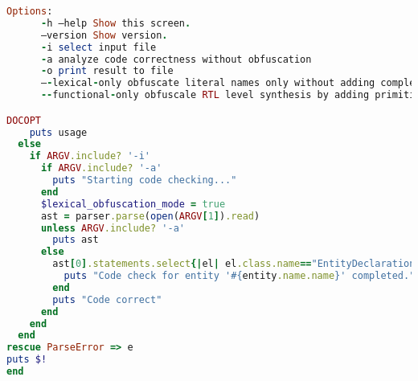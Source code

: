 \begin{lstlisting}[language=Ruby, style=rubystyle]
      Options:
      -h —help Show this screen.
      —version Show version.
      -i select input file
      -a analyze code correctness without obfuscation
      -o print result to file
      —-lexical-only obfuscate literal names only without adding complexity to RTL level
      --functional-only obfuscale RTL level synthesis by adding primitives without changing literal names

DOCOPT
    puts usage
  else
    if ARGV.include? '-i'
      if ARGV.include? '-a'
        puts "Starting code checking..."
      end
      $lexical_obfuscation_mode = true
      ast = parser.parse(open(ARGV[1]).read)
      unless ARGV.include? '-a'
        puts ast
      else
        ast[0].statements.select{|el| el.class.name=="EntityDeclaration"}.each do |entity|
          puts "Code check for entity '#{entity.name.name}' completed."
        end
        puts "Code correct"
      end
    end
  end
rescue ParseError => e
puts $!
end


  \end{lstlisting}


